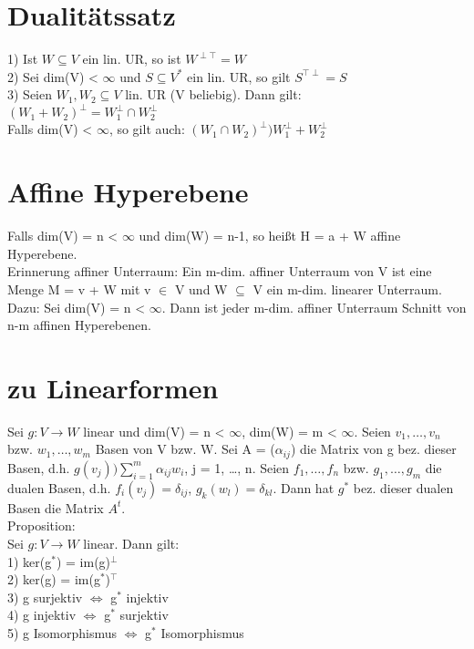 \section{Dualitätssatz}
1) Ist $W \subseteq V$ ein lin. UR, so ist $W^{\perp \top} = W$\\
2) Sei dim(V) < $\infty$ und $S \subseteq V^*$ ein lin. UR, so gilt  $S^{\top \perp} = S$\\
3) Seien $W_1, W_2 \subseteq V$ lin. UR (V beliebig). Dann gilt:\\
\hspace*{3mm} $(W_1 + W_2)^\perp = W_1^\perp \cap W_2^\perp$\\
\hspace*{3mm} Falls dim(V) < $\infty$, so gilt auch: $(W_1 \cap W_2)^\perp ) W_1^\perp + W_2^\perp$

\section{Affine Hyperebene}
Falls dim(V) = n < $\infty$ und dim(W) = n-1, so heißt H = a + W affine Hyperebene.\\
Erinnerung affiner Unterraum: Ein m-dim. affiner Unterraum von V ist eine Menge M = v + W mit  v $\in$ V und W $\subseteq$ V ein m-dim. linearer Unterraum.\\
Dazu: Sei dim(V) = n < $\infty$. Dann ist jeder m-dim. affiner Unterraum Schnitt von n-m affinen Hyperebenen.

\section{zu Linearformen}
Sei $g: V \to W$ linear und dim(V) = n < $\infty$, dim(W) = m < $\infty$. Seien $v_1, …, v_n$ bzw. $w_1, …, w_m$ Basen von V bzw. W. Sei A = ($\alpha_{ij}$) die Matrix von g bez. dieser Basen, d.h. $g(v_j) ) \sum\limits_{i=1}^m \alpha_{ij} w_i$, j = 1, …, n. Seien $f_1, …, f_n$ bzw. $g_1, …, g_m$ die dualen Basen, d.h. $f_i(v_j) = \delta_{ij}$, $g_k(w_l) = \delta_{kl}$. Dann hat $g^*$ bez. dieser dualen Basen die Matrix $A^t$.\\
Proposition:\\
Sei $g: V \to W$ linear. Dann gilt:\\
1) ker(g$^*$) = im(g)$^\perp$\\
2) ker(g) = im(g$^*$)$^\top$\\
3) g surjektiv $\Leftrightarrow$ g$^*$ injektiv\\
4) g injektiv $\Leftrightarrow$ g$^*$ surjektiv\\
5) g Isomorphismus $\Leftrightarrow$ g$^*$ Isomorphismus

